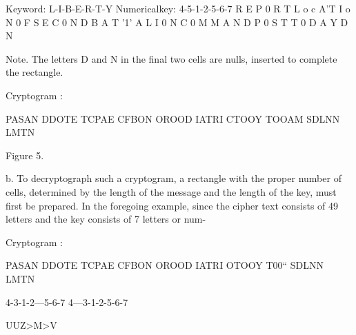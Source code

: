 

 

 

 

 

 

 

Keyword: L-I-B-E-R-T-Y
Numericalkey: 4-5-1-2-5-6-7
R E P 0 R T L
o c A'T I o N
0 F S E C 0 N
D B A T '1' A L
I 0 N C 0 M M
A N D P 0 S T
T 0 D A Y D N

 

 

 

 

 

 

 

 

 

Note. The letters D and N in the ﬁnal two cells are nulls, inserted to complete
the rectangle.

Cryptogram :

PASAN DDOTE TCPAE CFBON OROOD IATRI CTOOY
TOOAM SDLNN LMTN

Figure 5.


 


b. To decryptograph such a cryptogram, a rectangle with the proper
number of cells, determined by the length of the message and the length
of the key, must ﬁrst be prepared. In the foregoing example, since the
cipher text consists of 49 letters and the key consists of 7 letters or num-

Cryptogram :

PASAN DDOTE TCPAE CFBON OROOD IATRI OTOOY T00“
SDLNN LMTN

4-3-1-2—5-6-7 4—3-1-2-5-6-7

 

 

 

 

 

 

 

UUZ>M>V

 

 

 

 

 

 

 

 

 

 

